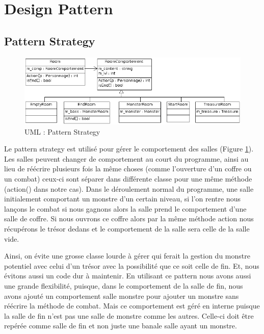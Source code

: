 \documentclass[a4paper]{article}
\begin{document}
  \newpage
  \section{Design Pattern}
    \subsection{Pattern Strategy}
      \begin{figure}[h]
        \centering
        \includegraphics[width=15cm]{./Strategy_UML.png}
        \caption{\label{fig:Strategy_UML} UML : Pattern Strategy}
      \end{figure}

Le pattern strategy est utilisé pour gérer le comportement des salles (Figure \ref{fig:Strategy_UML}\footnotemark[1]).
Les salles peuvent changer de comportement au court du programme, ainsi au lieu de réécrire plusieurs fois la même choses (comme l'ouverture d'un coffre ou un combat) ceux-ci sont séparer dans différente classe pour une même méthode (action() dans notre cas).
Dans le déroulement normal du programme, une salle initialement comportant un monstre d'un certain niveau, si l'on rentre nous lançons le combat si nous gagnons alors la salle prend le comportement d'une salle de coffre.
Si nous ouvrons ce coffre alors par la même méthode action nous récupérons le trésor dedans et le comportement de la salle sera celle de la salle vide.

Ainsi, on évite une grosse classe lourde à gérer qui ferait la gestion du monstre potentiel avec celui d'un trésor avec la possibilité que ce soit celle de fin.
Et, nous évitons aussi un code dur à maintenir.
En utilisant ce pattern nous avons aussi une grande flexibilité, puisque, dans le comportement de la salle de fin, nous avons ajouté un comportement salle monstre pour ajouter un monstre sans réécrire la méthode de combat.
Mais ce comportement est géré en interne puisque la salle de fin n'est pas une salle de monstre comme les autres.
Celle-ci doit être repérée comme salle de fin et non juste une banale salle ayant un monstre.
\end{document}
